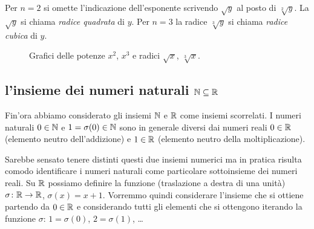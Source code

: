 %
%
Per $n=2$ si omette l'indicazione dell'esponente scrivendo $\sqrt y$ al posto di $\sqrt[2] y$.
La $\sqrt y$ si chiama \emph{radice quadrata} di $y$.
Per $n=3$ la radice $\sqrt[3]{y}$ si chiama \emph{radice cubica} di $y$.

\begin{figure}
  \begin{center}
  \end{center}
  \caption{Grafici delle potenze $x^2$, $x^3$ e radici
  $\sqrt x$, $\sqrt[3] x$.}
  \label{fig:potenza_intera_radice}
\end{figure}

\subsection{l'insieme dei numeri naturali ${\mathbb N} \subseteq {\mathbb R}$}
%
%
%
\index{$\NN$}%

Fin'ora abbiamo considerato gli insiemi $\NN$ 
e ${\mathbb R}$ come insiemi scorrelati. 
I numeri naturali $0\in {\mathbb N}$ e $1=\sigma(0)\in {\mathbb N}$ 
sono in generale diversi dai numeri reali 
$0\in {\mathbb R}$ (elemento neutro dell'addizione) 
e $1\in {\mathbb R}$ (elemento neutro della moltiplicazione).

Sarebbe sensato tenere distinti questi due insiemi numerici 
ma in pratica risulta comodo identificare i numeri naturali 
come particolare sottoinsieme dei numeri reali.
Su ${\mathbb R}$ possiamo definire la funzione (traslazione a destra di una unità)
$\sigma\colon {\mathbb R}\to{\mathbb R}$, $\sigma(x) = x+1$.
Vorremmo quindi considerare l'insieme che si ottiene 
partendo da $0\in {\mathbb R}$ e considerando tutti gli elementi che si
ottengono iterando la funzione $\sigma$: $1=\sigma(0)$, $2=\sigma(1)$, \dots

